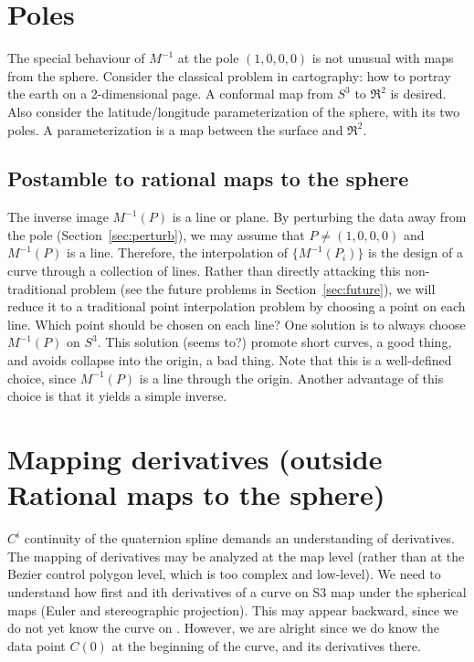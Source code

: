 \documentclass[12pt]{article}
\begin{document}
\clearpage

\section{Poles}

The special behaviour of $M^{-1}$ at the pole $(1,0,0,0)$
is not unusual with maps from the sphere.
Consider the classical problem in cartography: how to portray the earth
on a 2-dimensional page.
A conformal map from $S^3$ to $\Re^2$ is desired.
Also consider the latitude/longitude parameterization of the sphere, with its two poles.
A parameterization is a map between the surface and $\Re^2$.

\clearpage

\subsection{Postamble to rational maps to the sphere}

The inverse image $M^{-1}(P)$ is a line or plane.
By perturbing the data away from the pole (Section~\ref{sec:perturb}), 
we may assume that $P \neq (1,0,0,0)$ and $M^{-1}(P)$ is a line.
Therefore, the interpolation of $\{M^{-1}(P_i)\}$ is the design of a curve through a
collection of lines.
Rather than directly attacking this non-traditional problem (see the future problems in
Section~\ref{sec:future}), we will reduce it to a traditional point
interpolation problem by choosing a point on each line.
Which point should be chosen on each line?
One solution is to always choose $M^{-1}(P)$ on $S^3$.
This solution (seems to?) promote short curves, a good thing, 
and avoids collapse into the origin, a bad thing.
Note that this is a well-defined choice, since $M^{-1}(P)$ is a line through the origin.
Another advantage of this choice is that it yields a simple inverse.

\clearpage

\section{Mapping derivatives (outside Rational maps to the sphere)}

$C^i$ continuity of the quaternion spline demands an understanding of derivatives.
The mapping of derivatives may be analyzed at the map level 
(rather than at the Bezier control polygon level, which is too complex and low-level).
We need to understand how first and ith derivatives of a curve on S3 map under 
the spherical maps (Euler and stereographic projection).
This may appear backward, since we do not yet know the curve on .
However, we are alright since we do know the data point $C(0)$ at the beginning
of the curve, and its derivatives there.
\end{document}
